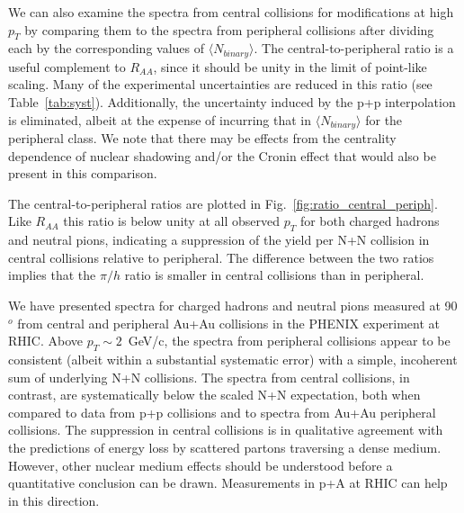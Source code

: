 \begin{multicols}{2}
We can also examine the spectra from central collisions for 
modifications at high $p_T$ by comparing
them to the spectra from peripheral collisions after dividing
each by the corresponding values of $\langle N_{binary} \rangle$.
The central-to-peripheral ratio is a useful 
complement to $R_{AA}$, since it should
be unity in the limit of point-like scaling.
Many of the experimental uncertainties
are reduced in this ratio (see Table~\ref{tab:syst}). 
%
%
Additionally, the uncertainty induced by the p+p interpolation
is eliminated, albeit at the expense of incurring that in 
$\langle N_{binary} \rangle$ for the peripheral class.
%
%
We note that there may be effects from the centrality dependence of nuclear
shadowing and/or the Cronin effect that would also be present in this
comparison.

The central-to-peripheral ratios are plotted in 
Fig.~\ref{fig:ratio_central_periph}.  Like $R_{AA}$ this ratio is
below unity at all observed $p_T$ for both charged hadrons and neutral 
pions, indicating a suppression of the yield per N+N
collision in central collisions relative to peripheral.
The difference between the two ratios 
implies that the $\pi/h$ ratio is smaller in central collisions 
than in peripheral.



%

We have presented spectra for charged hadrons and 
neutral pions measured at 90$^o$ from central and 
peripheral Au+Au 
collisions in the PHENIX experiment at RHIC.  
Above $p_T\sim 2$~GeV/c, 
the spectra from peripheral collisions appear
to be consistent (albeit within a substantial systematic
error) with a simple, incoherent sum of underlying
N+N collisions.  The spectra from central
collisions, in contrast, are systematically below the
scaled N+N expectation, both when compared
to data from p+p collisions and to spectra from Au+Au 
peripheral collisions. 
The suppression in central collisions 
is in qualitative agreement with the predictions of energy 
loss by scattered partons traversing a dense medium.
However, other nuclear medium effects should be understood
before a quantitative conclusion can be drawn.  Measurements
in p+A at RHIC can help in this direction.



\end{multicols}
